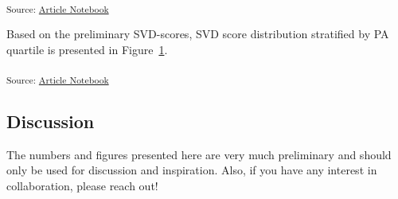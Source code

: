 \documentclass[
  letterpaper,
  DIV=11,
  numbers=noendperiod]{scrartcl}
\begin{document}
\textsubscript{Source:
\href{https://agdamsbo.github.io/svd-modification/index.qmd.html}{Article
Notebook}}

Based on the preliminary SVD-scores, SVD score distribution stratified
by PA quartile is presented in Figure~\ref{fig-svd_dist}.

\label{cell-fig-svd_dist}
\begin{figure}[H]


\caption{\label{fig-svd_dist}}

\end{figure}%

\textsubscript{Source:
\href{https://agdamsbo.github.io/svd-modification/index.qmd.html}{Article
Notebook}}

\subsection{Discussion}\label{discussion}

The numbers and figures presented here are very much preliminary and
should only be used for discussion and inspiration. Also, if you have
any interest in collaboration, please reach out!
\end{document}
